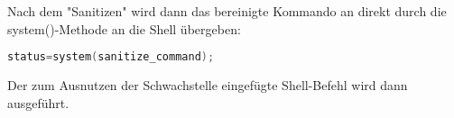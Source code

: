 Nach dem "Sanitizen" wird dann das bereinigte Kommando an direkt durch die system()-Methode an die Shell übergeben:\\

\begin{lstlisting}[firstnumber=402, language=C, caption=magick/delegate.c Aufruf system(),label={lst:lstlisting}]
  status=system(sanitize_command);
\end{lstlisting}
\vspace{5mm}

Der zum Ausnutzen der Schwachstelle eingefügte Shell-Befehl wird dann ausgeführt.